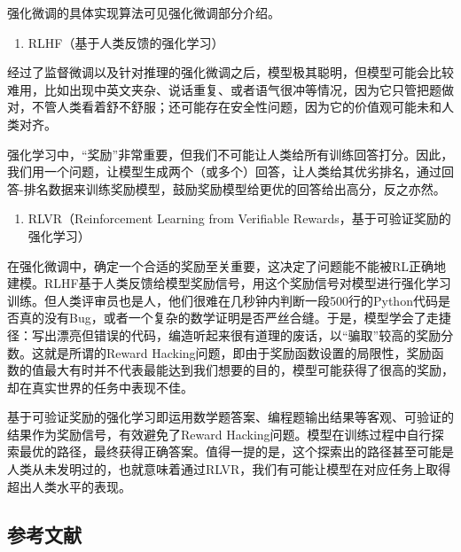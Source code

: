 强化微调的具体实现算法可见强化微调部分介绍。

\begin{enumerate}
\def\labelenumi{\arabic{enumi}.}
\setcounter{enumi}{2}
\tightlist
\item
  RLHF（基于人类反馈的强化学习）
\end{enumerate}

经过了监督微调以及针对推理的强化微调之后，模型极其聪明，但模型可能会比较难用，比如出现中英文夹杂、说话重复、或者语气很冲等情况，因为它只管把题做对，不管人类看着舒不舒服；还可能存在安全性问题，因为它的价值观可能未和人类对齐。

强化学习中，``奖励''非常重要，但我们不可能让人类给所有训练回答打分。因此，我们用一个问题，让模型生成两个（或多个）回答，让人类给其优劣排名，通过回答-排名数据来训练奖励模型，鼓励奖励模型给更优的回答给出高分，反之亦然。

\begin{enumerate}
\def\labelenumi{\arabic{enumi}.}
\setcounter{enumi}{3}
\tightlist
\item
  RLVR（Reinforcement Learning from Verifiable Rewards，基于可验证奖励的强化学习）
\end{enumerate}

在强化微调中，确定一个合适的奖励至关重要，这决定了问题能不能被RL正确地建模。RLHF基于人类反馈给模型奖励信号，用这个奖励信号对模型进行强化学习训练。但人类评审员也是人，他们很难在几秒钟内判断一段500行的Python代码是否真的没有Bug，或者一个复杂的数学证明是否严丝合缝。于是，模型学会了走捷径：写出漂亮但错误的代码，编造听起来很有道理的废话，以``骗取''较高的奖励分数。这就是所谓的Reward Hacking问题，即由于奖励函数设置的局限性，奖励函数的值最大有时并不代表最能达到我们想要的目的，模型可能获得了很高的奖励，却在真实世界的任务中表现不佳。

基于可验证奖励的强化学习即运用数学题答案、编程题输出结果等客观、可验证的结果作为奖励信号，有效避免了Reward Hacking问题。模型在训练过程中自行探索最优的路径，最终获得正确答案。值得一提的是，这个探索出的路径甚至可能是人类从未发明过的，也就意味着通过RLVR，我们有可能让模型在对应任务上取得超出人类水平的表现。

\hypertarget{ux53c2ux8003ux6587ux732e-74}{%
\subsection{参考文献}\label{ux53c2ux8003ux6587ux732e-74}}

